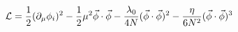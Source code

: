 \begin{equation} {\cal L} = \frac{1}{2} (\partial_\mu \phi_i)^2 -
\frac{1}{2}
\mu^2  \vec \phi \cdot \vec \phi  -\frac{\lambda_0}{4N}  (\vec \phi
\cdot \vec \phi )^2-
\frac{\eta}{6 N^2}
 (\vec \phi
\cdot \vec \phi) ^3
\end{equation}


